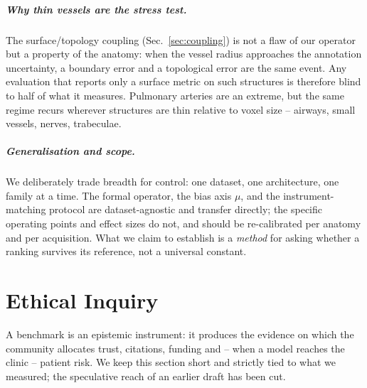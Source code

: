 \documentclass[
    bookmarks, bookmarksnumbered, bookmarksopen,
    colorlinks=true, citecolor=blue, linkcolor=blue, urlcolor=blue
]{techrep}
\begin{document}
\paragraph{Why thin vessels are the stress test.} The surface/topology coupling
(Sec.~\ref{sec:coupling}) is not a flaw of our operator but a property of the anatomy:
when the vessel radius approaches the annotation uncertainty, a boundary error and a
topological error are the same event. Any evaluation that reports only a surface metric
on such structures is therefore blind to half of what it measures. Pulmonary arteries are
an extreme, but the same regime recurs wherever structures are thin relative to voxel
size -- airways, small vessels, nerves, trabeculae.

\paragraph{Generalisation and scope.} We deliberately trade breadth for control: one
dataset, one architecture, one family at a time. The formal operator, the bias axis
$\mu$, and the instrument-matching protocol are dataset-agnostic and transfer directly;
the specific operating points and effect sizes do not, and should be re-calibrated per
anatomy and per acquisition. What we claim to establish is a \emph{method} for asking
whether a ranking survives its reference, not a universal constant.

\chapter{Ethical Inquiry}\label{sec:ethics}
A benchmark is an epistemic instrument: it produces the evidence on which the community
allocates trust, citations, funding and -- when a model reaches the clinic -- patient risk. We
keep this section short and strictly tied to what we measured; the speculative reach of an
earlier draft has been cut.
\end{document}
